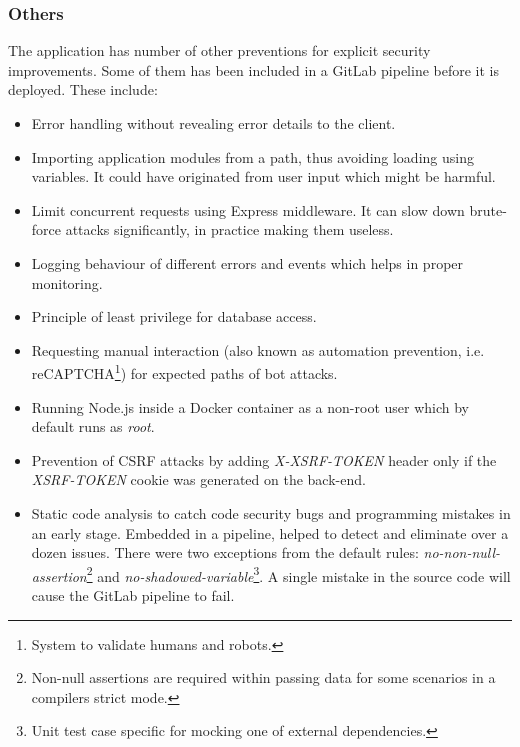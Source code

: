 \documentclass{article} %
\begin{document}
\subsubsection{Others}
\label{sec:security_others}
The application has number of other preventions for explicit security improvements. Some of them has been included in a GitLab pipeline before it is deployed. These include:
\begin{itemize}
    \item Error handling without revealing error details to the client.
    \item Importing application modules from a path, thus avoiding loading using variables. It could have originated from user input which might be harmful.
    \item Limit concurrent requests using Express middleware. It can slow down brute-force attacks significantly, in practice making them useless.
    \item Logging behaviour of different errors and events which helps in proper monitoring.
    \item Principle of least privilege for database access.
    \item Requesting manual interaction (also known as automation prevention, i.e. reCAPTCHA\footnote{System to validate humans and robots.}) for expected paths of bot attacks.
    \item Running Node.js inside a Docker container as a non-root user which by default runs as \textit{root}.
    \item Prevention of CSRF attacks by adding \textit{X-XSRF-TOKEN} header only if the \textit{XSRF-TOKEN} cookie was generated on the back-end.
    \item Static code analysis to catch code security bugs and programming mistakes in an early stage. Embedded in a pipeline, helped to detect and eliminate over a dozen issues. There were two exceptions from the default rules: \textit{no-non-null-assertion}\footnote{Non-null assertions are required within passing data for some scenarios in a compilers strict mode.} and \textit{no-shadowed-variable}\footnote{Unit test case specific for mocking one of external dependencies.}. A single mistake in the source code will cause the GitLab pipeline to fail.

\end{itemize}
\end{document}
